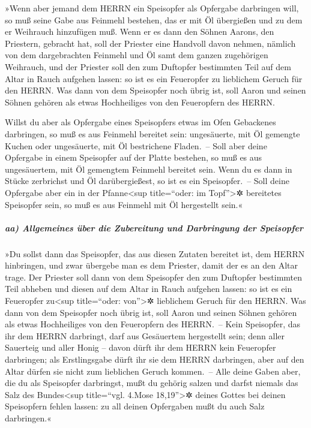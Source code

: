 »Wenn aber jemand dem HERRN ein Speisopfer als Opfergabe
darbringen will, so muß seine Gabe aus Feinmehl bestehen, das er mit Öl
übergießen und zu dem er Weihrauch hinzufügen muß. Wenn er
es dann den Söhnen Aarons, den Priestern, gebracht hat, soll der
Priester eine Handvoll davon nehmen, nämlich von dem dargebrachten
Feinmehl und Öl samt dem ganzen zugehörigen Weihrauch, und der Priester
soll den zum Duftopfer bestimmten Teil auf dem Altar in Rauch aufgehen
lassen: so ist es ein Feueropfer zu lieblichem Geruch für den HERRN.
Was dann von dem Speisopfer noch übrig ist, soll Aaron und
seinen Söhnen gehören als etwas Hochheiliges von den Feueropfern des
HERRN.

Willst du aber als Opfergabe eines Speisopfers etwas im
Ofen Gebackenes darbringen, so muß es aus Feinmehl bereitet sein:
ungesäuerte, mit Öl gemengte Kuchen oder ungesäuerte, mit Öl bestrichene
Fladen.~-- Soll aber deine Opfergabe in einem Speisopfer
auf der Platte bestehen, so muß es aus ungesäuertem, mit Öl gemengtem
Feinmehl bereitet sein. Wenn du es dann in Stücke
zerbrichst und Öl darübergießest, so ist es ein Speisopfer.~--
Soll deine Opfergabe aber ein in der Pfanne\textless sup
title=``oder: im Topf''\textgreater✲ bereitetes Speisopfer sein, so muß
es aus Feinmehl mit Öl hergestellt sein.«

\hypertarget{aa-allgemeines-uxfcber-die-zubereitung-und-darbringung-der-speisopfer}{%
\subparagraph{aa) Allgemeines über die Zubereitung und Darbringung der
Speisopfer}\label{aa-allgemeines-uxfcber-die-zubereitung-und-darbringung-der-speisopfer}}

»Du sollst dann das Speisopfer, das aus diesen Zutaten
bereitet ist, dem HERRN hinbringen, und zwar übergebe man es dem
Priester, damit der es an den Altar trage. Der Priester
soll dann von dem Speisopfer den zum Duftopfer bestimmten Teil abheben
und diesen auf dem Altar in Rauch aufgehen lassen: so ist es ein
Feueropfer zu\textless sup title=``oder: von''\textgreater✲ lieblichem
Geruch für den HERRN. Was dann von dem Speisopfer noch
übrig ist, soll Aaron und seinen Söhnen gehören als etwas Hochheiliges
von den Feueropfern des HERRN.~-- Kein Speisopfer, das
ihr dem HERRN darbringt, darf aus Gesäuertem hergestellt sein; denn
aller Sauerteig und aller Honig -- davon dürft ihr dem HERRN kein
Feueropfer darbringen; als Erstlingsgabe dürft ihr sie
dem HERRN darbringen, aber auf den Altar dürfen sie nicht zum lieblichen
Geruch kommen.~-- Alle deine Gaben aber, die du als
Speisopfer darbringst, mußt du gehörig salzen und darfst niemals das
Salz des Bundes\textless sup title=``vgl. 4.Mose 18,19''\textgreater✲
deines Gottes bei deinen Speisopfern fehlen lassen: zu all deinen
Opfergaben mußt du auch Salz darbringen.«

